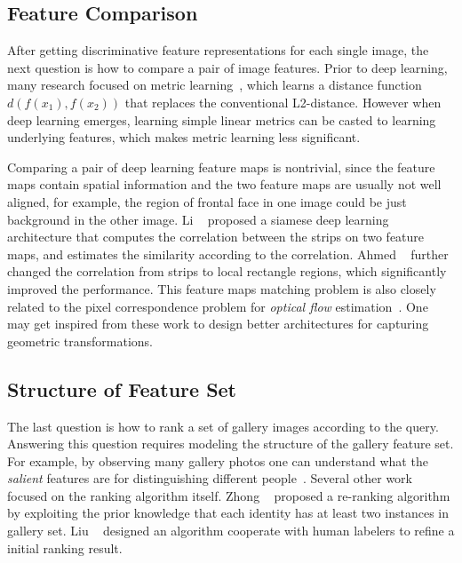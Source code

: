 \subsection{Feature Comparison} %
\label{sub:human-id-feat-comp}
After getting discriminative feature representations for each single image, the next question is how to compare a pair of image features. Prior to deep learning, many research focused on metric learning~\cite{davis2007information,weinberger2005distance,mcfee2010metric,koestinger2012large,liao2015person,zhang2016learning}, which learns a distance function $d(f(x_1), f(x_2))$ that replaces the conventional L2-distance. However when deep learning emerges, learning simple linear metrics can be casted to learning underlying features, which makes metric learning less significant.

Comparing a pair of deep learning feature maps is nontrivial, since the feature maps contain spatial information and the two feature maps are usually not well aligned, for example, the region of frontal face in one image could be just background in the other image. Li \etal~\cite{li2014deepreid} proposed a siamese deep learning architecture that computes the correlation between the strips on two feature maps, and estimates the similarity according to the correlation. Ahmed \etal~\cite{ahmed2015improved} further changed the correlation from strips to local rectangle regions, which significantly improved the performance. This feature maps matching problem is also closely related to the pixel correspondence problem for \emph{optical flow} estimation~\cite{weinzaepfel2013deepflow,revaud2016deepmatching}. One may get inspired from these work to design better architectures for capturing geometric transformations.

\subsection{Structure of Feature Set} %
\label{sub:structure_of_feature_set}
The last question is how to rank a set of gallery images according to the query. Answering this question requires modeling the structure of the gallery feature set. For example, by observing many gallery photos one can understand what the \emph{salient} features are for distinguishing different people~\cite{zhao2013unsupervised,zhao2017person}. Several other work focused on the ranking algorithm itself. Zhong \etal~\cite{zhong2017re} proposed a re-ranking algorithm by exploiting the prior knowledge that each identity has at least two instances in gallery set. Liu \etal~\cite{liu2013pop} designed an algorithm cooperate with human labelers to refine a initial ranking result.
